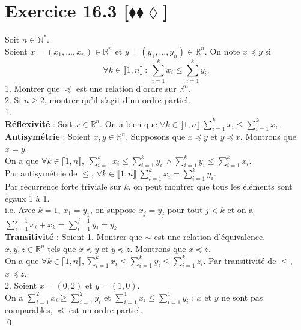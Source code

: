 \documentclass[10pt]{article}
\begin{document}
\section*{Exercice 16.3 [$\blacklozenge\blacklozenge\lozenge$]}
\begin{tcolorbox}[enhanced, width=7.6in, center, size=fbox, fontupper=\large, drop shadow southwest]
    Soit $n\in\mathbb{N}^*$.\\
    Soient $x=(x_1,...,x_n)\in\mathbb{R}^n$ et $y=(y_1,...,y_n)\in\mathbb{R}^n$. On note $x \preceq y$ si
    \begin{equation*}
        \forall k \in \llbracket 1, n \rrbracket ~ : ~ \sum_{i=1}^kx_i \leq \sum_{i=1}^ky_i.
    \end{equation*}
    1. Montrer que $\preceq$ est une relation d'ordre sur $\mathbb{R}^n$.\\
    2. Si $n \geq 2$, montrer qu'il s'agit d'un ordre partiel.\\[0.2cm]
    1.\\
    \textbf{Réflexivité} : Soit $x\in\mathbb{R}^n$. On a bien que $\forall k \in \llbracket 1,n \rrbracket ~\sum_{i=1}^kx_i \leq \sum_{i=1}^kx_i$.\\[0.1cm]
    \textbf{Antisymétrie} : Soient $x,y\in\mathbb{R}^n$. Supposons que $x \preceq y$ et $y \preceq x$. Montrons que $x=y$.\\
    On a que $\forall k \in \llbracket 1, n \rrbracket, ~ \sum_{i=1}^kx_i \leq \sum_{i=1}^ky_i ~ \wedge \sum_{i=1}^ky_i \leq \sum_{i=1}^kx_i$.\\
    Par antisymétrie de $\leq$, $\forall k \in \llbracket 1, n \rrbracket ~ \sum_{i=1}^kx_i = \sum_{i=1}^k y_i$.\\
    Par récurrence forte triviale sur $k$, on peut montrer que tous les éléments sont égaux 1 à 1.\\
    i.e. Avec $k=1$, $x_1=y_1$, on suppose $x_j = y_j$ pour tout $j<k$ et on a $\sum_{i=1}^{j-1}x_i + x_k = \sum_{i=1}^{j-1}y_i = y_k $\\[0.15cm]
    \textbf{Transitivité} : Soient     1. Montrer que $\sim$ est une relation d'équivalence.\\$x,y,z \in \mathbb{R}^n$ tels que $x \preceq y$ et $y \preceq z$. Montrons que $x \preceq z$.\\
    On a que $\forall k \in \llbracket 1, n \rrbracket, \sum_{i=1}^kx_i \leq \sum_{i=1}^ky_i\leq\sum_{i=1}^kz_i$. Par transitivité de $\leq$, $x \preceq z$.\\[0.2cm]
    2. Soient $x=(0,2)$ et $y=(1,0)$.\\
    On a $\sum_{i=1}^2x_i \geq \sum_{i=1}^2y_i$ et $\sum_{i=1}^1x_i \leq \sum_{i=1}^1y_i$ : $x$ et $y$ ne sont pas comparables, $\preceq$ est un ordre partiel.\\
    \qed
\end{tcolorbox}
\end{document}
